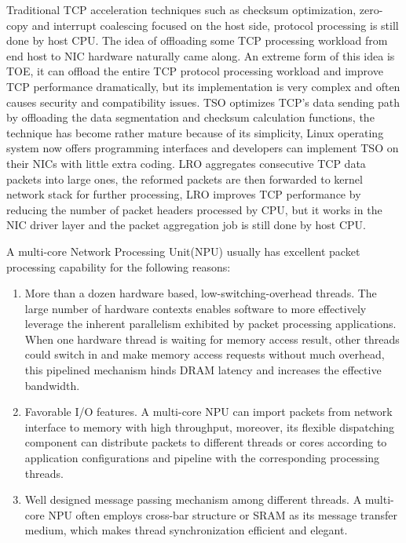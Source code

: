 \documentclass[conference]{IEEEtran}
\begin{document}
Traditional TCP acceleration techniques such as checksum optimization\cite{braden1989computing}\cite{mallory1990incremental}\cite{rijsinghani1994computation}\cite{kleinpaste1995software}, zero-copy\cite{chu1996zero} and interrupt coalescing\cite{dong2011optimizing} focused on the host side, protocol processing is still done by host CPU. The idea of offloading some TCP processing workload from end host to NIC hardware naturally came along. An extreme form of this idea is TOE\cite{yeh2002introduction}, it can offload the entire TCP protocol processing workload and improve TCP performance dramatically, but its implementation is very complex and often causes security and compatibility issues\cite{mogul2003tcp}. TSO\cite{connery1999offload} optimizes TCP's data sending path by offloading the data segmentation and checksum calculation functions, the technique has become rather mature because of its simplicity, Linux operating system now offers programming interfaces and developers can implement TSO on their NICs with little extra coding. LRO\cite{grossman2005large} aggregates consecutive TCP data packets into large ones, the reformed packets are then forwarded to kernel network stack for further processing, LRO improves TCP performance by reducing the number of packet headers processed by CPU, but it works in the NIC driver layer and the packet aggregation job is still done by host CPU.

A multi-core Network Processing Unit(NPU) usually has excellent packet processing capability for the following reasons:
\begin{enumerate}
\item More than a dozen hardware based, low-switching-overhead threads. The large number of hardware contexts enables software to more effectively leverage the inherent parallelism exhibited by packet processing applications. When one hardware thread is waiting for memory access result, other threads could switch in and make memory access requests without much overhead, this pipelined mechanism hinds DRAM latency and increases the effective bandwidth.
\item Favorable I/O features. A multi-core NPU can import packets from network interface to memory with high throughput, moreover, its flexible dispatching component can distribute packets to different threads or cores according to application configurations and pipeline with the corresponding processing threads.
\item Well designed message passing mechanism among different threads. A multi-core NPU often employs cross-bar structure or SRAM as its message transfer medium, which makes thread synchronization efficient and elegant.
\end{enumerate}
\end{document}
